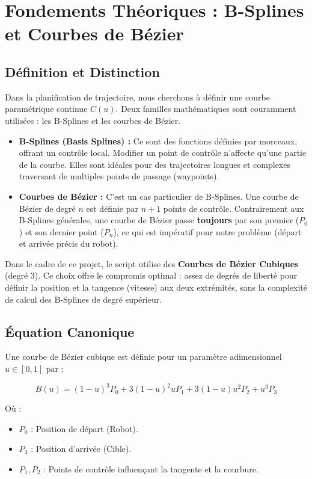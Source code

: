 \documentclass[12pt]{report}
\theoremstyle{plain}
\begin{document}
\section{Fondements Théoriques : B-Splines et Courbes de Bézier}

\subsection{Définition et Distinction}
Dans la planification de trajectoire, nous cherchons à définir une courbe paramétrique continue $C(u)$. Deux familles mathématiques sont couramment utilisées : les B-Splines et les courbes de Bézier.

\begin{itemize}
    \item \textbf{B-Splines (Basis Splines) :} Ce sont des fonctions définies par morceaux, offrant un contrôle local. Modifier un point de contrôle n'affecte qu'une partie de la courbe. Elles sont idéales pour des trajectoires longues et complexes traversant de multiples points de passage (waypoints).
    \item \textbf{Courbes de Bézier :} C'est un cas particulier de B-Splines. Une courbe de Bézier de degré $n$ est définie par $n+1$ points de contrôle. Contrairement aux B-Splines générales, une courbe de Bézier passe \textbf{toujours} par son premier ($P_0$) et son dernier point ($P_n$), ce qui est impératif pour notre problème (départ et arrivée précis du robot).
\end{itemize}

Dans le cadre de ce projet, le script utilise des \textbf{Courbes de Bézier Cubiques} (degré 3). Ce choix offre le compromis optimal : assez de degrés de liberté pour définir la position et la tangence (vitesse) aux deux extrémités, sans la complexité de calcul des B-Splines de degré supérieur.

\subsection{Équation Canonique}
Une courbe de Bézier cubique est définie pour un paramètre adimensionnel $u \in [0, 1]$ par :

\begin{equation}
    B(u) = (1-u)^3 P_0 + 3(1-u)^2 u P_1 + 3(1-u) u^2 P_2 + u^3 P_3
\end{equation}

Où :
\begin{itemize}
    \item $P_0$ : Position de départ (Robot).
    \item $P_3$ : Position d'arrivée (Cible).
    \item $P_1, P_2$ : Points de contrôle influençant la tangente et la courbure.
\end{itemize}
\end{document}
